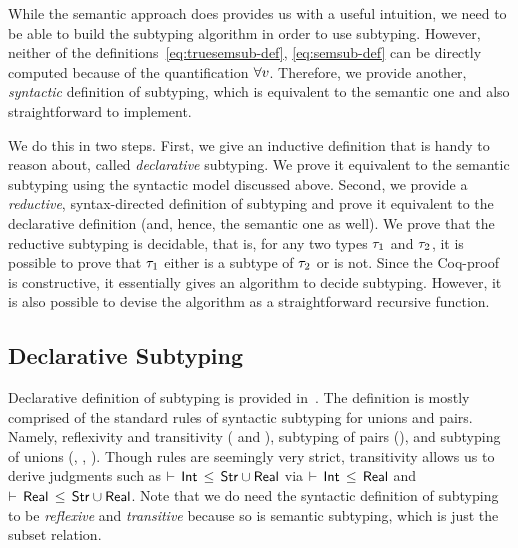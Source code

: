 While the semantic approach does provides us with a useful intuition,
we need to be able to build the subtyping algorithm in order to use subtyping.
However, neither of the definitions~\eqref{eq:truesemsub-def}, \eqref{eq:semsub-def} 
can be directly computed because of the quantification $\forall v$.
Therefore, we provide another, \emph{syntactic} 
definition of subtyping, which is
equivalent to the semantic one and also straightforward to implement.

We do this in two steps. 
First, we give an inductive definition that is handy to reason about,
called \emph{declarative} subtyping. 
We prove it equivalent to the semantic subtyping using the syntactic model
discussed above.
Second, we provide a \emph{reductive}, syntax-directed definition of subtyping
and prove it equivalent to the declarative definition 
(and, hence, the semantic one as well).
We prove that the reductive subtyping is decidable, 
that is, for any two types $\tau_1$ and $\tau_2$,
it is possible to prove that $\tau_1$ either is a subtype of $\tau_2$ or is not.
Since the Coq-proof is constructive, it essentially gives an algorithm
to decide subtyping. However, it is also possible to devise the algorithm
as a straightforward recursive function.

\subsection{Declarative Subtyping}

Declarative definition of subtyping is provided in~.
The definition is mostly comprised of the standard rules
of syntactic subtyping for unions and pairs.
Namely, reflexivity and transitivity ( and ), 
subtyping of pairs (),
and subtyping of unions (, , ).
Though  rules are seemingly very strict, 
transitivity allows us to derive judgments such as
$\vdash \, \mathsf{Int} \, \leq \, \mathsf{Str} \cup \mathsf{Real}$ via
$\vdash \, \mathsf{Int} \, \leq \, \mathsf{Real}$ and $\vdash \, \mathsf{Real} \, \leq \, \mathsf{Str} \cup \mathsf{Real}$.
Note that we do need the syntactic definition of subtyping
to be \emph{reflexive} and \emph{transitive}
because so is semantic subtyping, which is just the subset relation.

